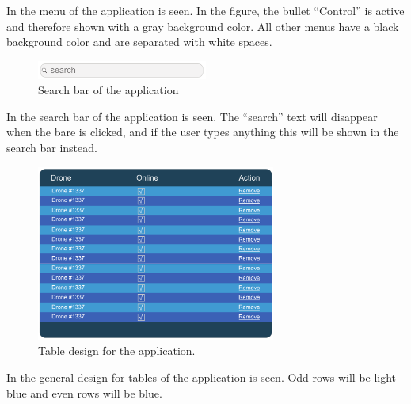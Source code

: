 In  the menu of the application is seen.
In the figure, the bullet ``Control'' is active and therefore shown with a gray background color.
All other menus have a black background color and are separated with white spaces.

\begin{figure}[htb]
    \centering
    \includegraphics[width=0.5\textwidth]{gfx/search.pdf}
    \caption{Search bar of the application}
    \label{fig:search_bar_design}
\end{figure}

In  the search bar of the application is seen.
The ``search'' text will disappear when the bare is clicked, and if the user types anything this will be shown in the search bar instead.

\begin{figure}[htb]
    \centering
    \includegraphics[width=0.7\textwidth]{gfx/table.pdf}
    \caption{Table design for the application.}
    \label{fig:table_design}
\end{figure}
In  the general design for tables of the application is seen.
Odd rows will be light blue and even rows will be blue.

